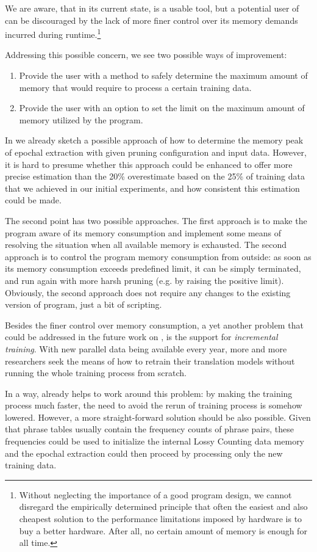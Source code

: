 We are aware, that in its current state, \eppex{} is a usable tool,
but a potential user of \eppex{} can be discouraged by the lack of more
finer control over its memory demands incurred during
runtime.\footnote{Without neglecting the importance of a good program design,
we cannot disregard the empirically determined principle that often the easiest
and also cheapest solution to the performance limitations imposed by hardware
is to buy a better hardware. After all, no certain amount of memory is enough
for all time.}

Addressing this possible concern, we see two possible ways of improvement:
\begin{enumerate}
  \item Provide the user with a method to safely determine the maximum amount
    of memory that \eppex{} would require to process a certain training data.
  \item Provide the user with an option to set the limit on the maximum amount
    of memory utilized by the program.
\end{enumerate}

In  we already sketch a possible approach of how to determine
the memory peak of epochal extraction with given pruning configuration and input data.
However, it is hard to presume whether this approach could be enhanced to offer
more precise estimation than the 20\% overestimate based on the 25\% of training
data that we achieved in our initial experiments, and how consistent this estimation
could be made.

The second point has two possible approaches.
The first approach is to make the program aware of its memory consumption and implement
some means of resolving the situation when all available memory is exhausted.
The second approach is to control the program memory consumption from outside:
as soon as its memory consumption exceeds predefined limit, it can be simply terminated, 
and run again with more harsh pruning (e.g. by raising the positive limit).
Obviously, the second approach does not require any changes to the existing version of
program, just a bit of scripting.

Besides the finer control over memory consumption, a yet another problem that could
be addressed in the future work on \eppex{}, is the support for \emph{incremental
training}.
With new parallel data being available every year, more and more researchers seek
the means of how to retrain their translation models without running the whole
training process from scratch.

In a way, \eppex{} already helps to work around this problem: by making the training
process much faster, the need to avoid the rerun of training process is somehow
lowered.
However, a more straight-forward solution should be also possible.
Given that phrase tables usually contain the frequency counts of phrase pairs,
these frequencies could be used to initialize the internal Lossy Counting data
memory and the epochal extraction could then proceed by processing only the new
training data.
